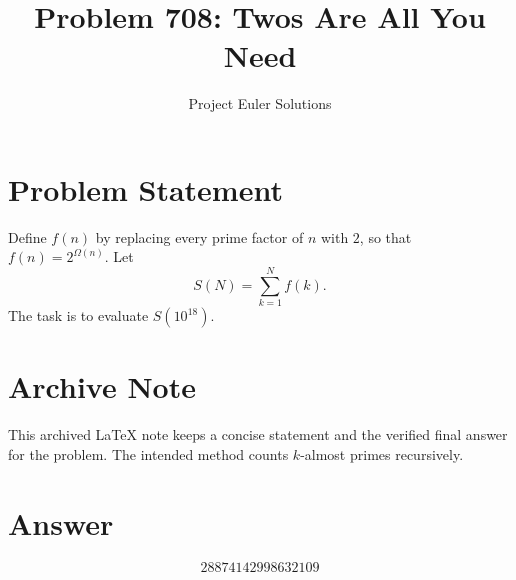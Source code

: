 \documentclass[11pt]{article}
\title{Problem 708: Twos Are All You Need}
\author{Project Euler Solutions}
\date{}
\begin{document}
\maketitle

\section{Problem Statement}
Define $f(n)$ by replacing every prime factor of $n$ with $2$, so that $f(n)=2^{\Omega(n)}$. Let
\[
S(N)=\sum_{k=1}^{N} f(k).
\]
The task is to evaluate $S(10^{18})$.

\section{Archive Note}
This archived LaTeX note keeps a concise statement and the verified final answer for the problem. The intended method counts $k$-almost primes recursively.

\section{Answer}

\[
\boxed{28874142998632109}
\]
\end{document}
